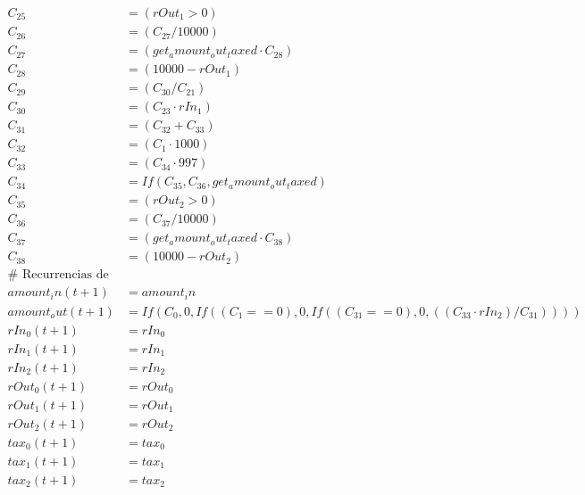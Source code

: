 \documentclass[10pt, a4paper]{article}
\begin{document}
\begin{align*}
C_25 &= (rOut_1 > 0) \\
C_26 &= (C_{27} / 10000) \\
C_27 &= (get_amount_out_taxed  \cdot  C_{28}) \\
C_28 &= (10000 - rOut_1) \\
C_29 &= (C_{30} / C_{21}) \\
C_30 &= (C_{23}  \cdot  rIn_1) \\
C_31 &= (C_{32} + C_{33}) \\
C_32 &= (C_{1}  \cdot  1000) \\
C_33 &= (C_{34}  \cdot  997) \\
C_34 &= If(C_{35}, C_{36}, get_amount_out_taxed) \\
C_35 &= (rOut_2 > 0) \\
C_36 &= (C_{37} / 10000) \\
C_37 &= (get_amount_out_taxed  \cdot  C_{38}) \\
C_38 &= (10000 - rOut_2) \\
\text{# Recurrencias de estado} \\
amount_in(t+1) &= amount_in \\
amount_out(t+1) &= If(C_{0}, 0, If((C_{1} == 0), 0, If((C_{31} == 0), 0, ((C_{33}  \cdot  rIn_2) / C_{31})))) \\
rIn_0(t+1) &= rIn_0 \\
rIn_1(t+1) &= rIn_1 \\
rIn_2(t+1) &= rIn_2 \\
rOut_0(t+1) &= rOut_0 \\
rOut_1(t+1) &= rOut_1 \\
rOut_2(t+1) &= rOut_2 \\
tax_0(t+1) &= tax_0 \\
tax_1(t+1) &= tax_1 \\
tax_2(t+1) &= tax_2 \\
\end{align*}
\end{document}
